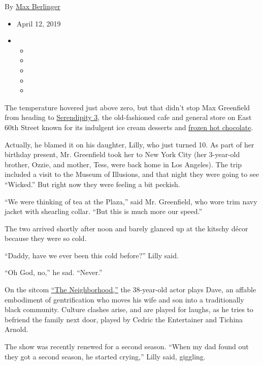 By \href{https://www.nytimes.com/by/max-berlinger}{Max Berlinger}

\begin{itemize}
\item
  April 12, 2019
\item
  \begin{itemize}
  \item
  \item
  \item
  \item
  \item
  \end{itemize}
\end{itemize}

The temperature hovered just above zero, but that didn't stop Max
Greenfield from heading to \href{https://serendipity3.com/}{Serendipity
3}, the old-fashioned cafe and general store on East 60th Street known
for its indulgent ice cream desserts and
\href{https://www.nytimes.com/1994/12/14/garden/pssst-serendipity-s-chocolate-secret.html}{frozen
hot chocolate}.

Actually, he blamed it on his daughter, Lilly, who just turned 10. As
part of her birthday present, Mr. Greenfield took her to New York City
(her 3-year-old brother, Ozzie, and mother, Tess, were back home in Los
Angeles). The trip included a visit to the Museum of Illusions, and that
night they were going to see ``Wicked.'' But right now they were feeling
a bit peckish.

``We were thinking of tea at the Plaza,'' said Mr. Greenfield, who wore
trim navy jacket with shearling collar. ``But this is much more our
speed.''

The two arrived shortly after noon and barely glanced up at the kitschy
décor because they were so cold.

``Daddy, have we ever been this cold before?'' Lilly said.

``Oh God, no,'' he sad. ``Never.''

On the sitcom
\href{https://www.nytimes.com/2018/09/28/arts/television/cedric-the-entertainer-max-greenfield-the-neighborhood.html?module=inline}{``The
Neighborhood,''} the 38-year-old actor plays Dave, an affable embodiment
of gentrification who moves his wife and son into a traditionally black
community. Culture clashes arise, and are played for laughs, as he tries
to befriend the family next door, played by Cedric the Entertainer and
Tichina Arnold.

The show was recently renewed for a second season. ``When my dad found
out they got a second season, he started crying,'' Lilly said, giggling.

